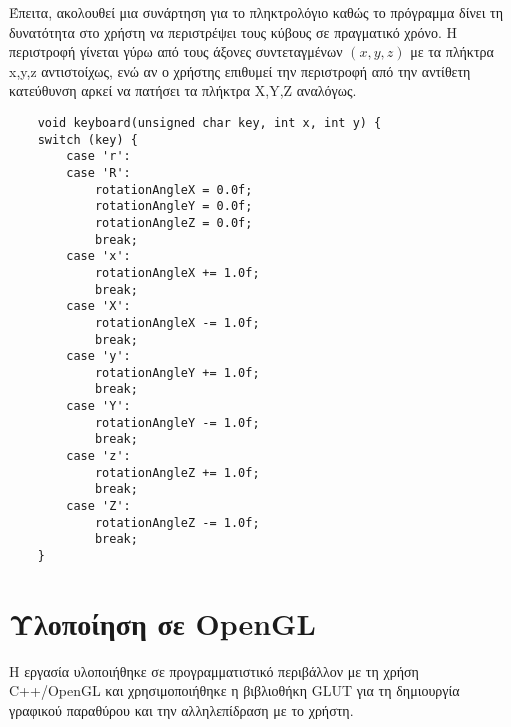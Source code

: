 Έπειτα, ακολουθεί μια συνάρτηση για το πληκτρολόγιο καθώς το πρόγραμμα δίνει τη δυνατότητα στο χρήστη να περιστρέψει τους κύβους σε πραγματικό χρόνο. Η περιστροφή γίνεται γύρω από τους άξονες συντεταγμένων $(x,y,z)$ με τα πλήκτρα x,y,z αντιστοίχως, ενώ αν ο χρήστης επιθυμεί την περιστροφή από την αντίθετη κατεύθυνση αρκεί να πατήσει τα πλήκτρα X,Y,Ζ αναλόγως.

\begin{verbatim}
    void keyboard(unsigned char key, int x, int y) {
    switch (key) {
        case 'r':
        case 'R':
            rotationAngleX = 0.0f;
            rotationAngleY = 0.0f;
            rotationAngleZ = 0.0f;
            break;
        case 'x':
            rotationAngleX += 1.0f;
            break;
        case 'X':
            rotationAngleX -= 1.0f;
            break;
        case 'y':
            rotationAngleY += 1.0f;
            break;
        case 'Y':
            rotationAngleY -= 1.0f;
            break;
        case 'z':
            rotationAngleZ += 1.0f;
            break;
        case 'Z':
            rotationAngleZ -= 1.0f;
            break;
    }
\end{verbatim}


\section{Υλοποίηση σε \textlatin{OpenGL}}

Η εργασία υλοποιήθηκε σε προγραμματιστικό περιβάλλον με τη χρήση \textlatin{C++/OpenGL} και χρησιμοποιήθηκε η βιβλιοθήκη \textlatin{GLUT} για τη δημιουργία γραφικού παραθύρου και την αλληλεπίδραση με το χρήστη. 

